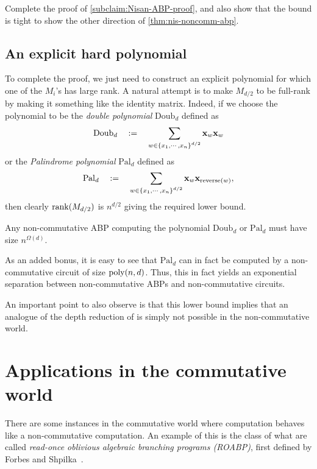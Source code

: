 \begin{exercise}
Complete the proof of  \autoref{subclaim:Nisan-ABP-proof}, and also show that the bound is tight to show the other direction of \autoref{thm:nis-noncomm-abp}. 
\end{exercise}

\subsection{An explicit hard polynomial}

To complete the proof, we just need to construct an explicit polynomial for which one of the $M_i$'s has large rank. A natural attempt is to make $M_{d/2}$ to be full-rank by making it something like the identity matrix. Indeed, if we choose the polynomial to be the \emph{double polynomial} $\mathrm{Doub}_d$ defined as
\[
\mathrm{Doub}_d \quad := \quad \sum_{w\in \left\{x_1, \cdots, x_n\right\}^{d/2}} \mathbf{x}_{w} \mathbf{x}_w
\]
or the \emph{Palindrome polynomial} $\mathrm{Pal}_d$ defined as
\[
\mathrm{Pal}_d \quad := \quad \sum_{w\in \left\{x_1, \cdots, x_n\right\}^{d/2}} \mathbf{x}_{w} \mathbf{x}_{\mathrm{reverse}(w)},
\]
then clearly $\operatorname{rank}(M_{d/2})$ is $n^{d/2}$ giving the required lower bound. 

\begin{theorem} Any non-commutative ABP computing the polynomial $\mathrm{Doub}_d$ or $\mathrm{Pal}_d$ must have size $n^{\Omega(d)}$. 
\end{theorem}

As an added bonus, it is easy to see that $\mathrm{Pal}_d$ can in fact be computed by a non-commutative circuit of size $\operatorname{poly}(n,d)$.
Thus, this in fact yields an exponential separation between non-commutative ABPs and non-commutative circuits.
 
An important point to also observe is that this lower bound implies that an analogue of the depth reduction of \cite{vsbr83} is simply not possible in the non-commutative world. 

\section{Applications in the commutative world}

There are some instances in the commutative world where computation behaves like a non-commutative computation.
An example of this is the class of what are called \emph{read-once oblivious algebraic branching programs (ROABP)}, first defined by Forbes and Shpilka~\cite{FS13}.



